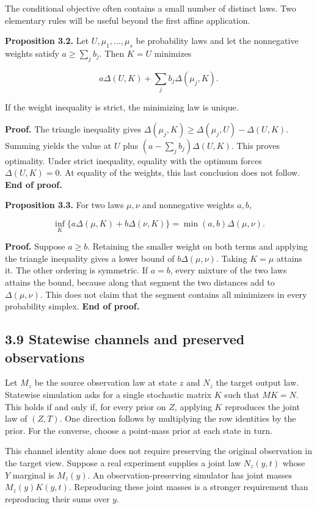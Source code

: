 \documentclass[
]{article}
\begin{document}
The conditional objective often contains a small number of distinct
laws. Two elementary rules will be useful beyond the first affine
application.

\textbf{Proposition 3.2.} Let \(U,\mu_1,\ldots,\mu_s\) be probability
laws and let the nonnegative weights satisfy \(a\ge\sum_jb_j\). Then
\(K=U\) minimizes

\[
a\Delta(U,K)+\sum_jb_j\Delta(\mu_j,K).
\]

If the weight inequality is strict, the minimizing law is unique.

\textbf{Proof.} The triangle inequality gives
\(\Delta(\mu_j,K)\ge\Delta(\mu_j,U)-\Delta(U,K)\). Summing yields the
value at \(U\) plus \((a-\sum_jb_j)\Delta(U,K)\). This proves
optimality. Under strict inequality, equality with the optimum forces
\(\Delta(U,K)=0\). At equality of the weights, this last conclusion does
not follow. \textbf{End of proof.}

\textbf{Proposition 3.3.} For two laws \(\mu,\nu\) and nonnegative
weights \(a,b\),

\[
\inf_K\{a\Delta(\mu,K)+b\Delta(\nu,K)\}
=\min(a,b)\Delta(\mu,\nu).
\]

\textbf{Proof.} Suppose \(a\ge b\). Retaining the smaller weight on both
terms and applying the triangle inequality gives a lower bound of
\(b\Delta(\mu,\nu)\). Taking \(K=\mu\) attains it. The other ordering is
symmetric. If \(a=b\), every mixture of the two laws attains the bound,
because along that segment the two distances add to \(\Delta(\mu,\nu)\).
This does not claim that the segment contains all minimizers in every
probability simplex. \textbf{End of proof.}

\subsection{3.9 Statewise channels and preserved
observations}\label{statewise-channels-and-preserved-observations}

Let \(M_z\) be the source observation law at state \(z\) and \(N_z\) the
target output law. Statewise simulation asks for a single stochastic
matrix \(K\) such that \(MK=N\). This holds if and only if, for every
prior on \(Z\), applying \(K\) reproduces the joint law of \((Z,T)\).
One direction follows by multiplying the row identities by the prior.
For the converse, choose a point-mass prior at each state in turn.

This channel identity alone does not require preserving the original
observation in the target view. Suppose a real experiment supplies a
joint law \(N_z(y,t)\) whose \(Y\) marginal is \(M_z(y)\). An
observation-preserving simulator has joint masses \(M_z(y)K(y,t)\).
Reproducing these joint masses is a stronger requirement than
reproducing their sums over \(y\).
\end{document}
